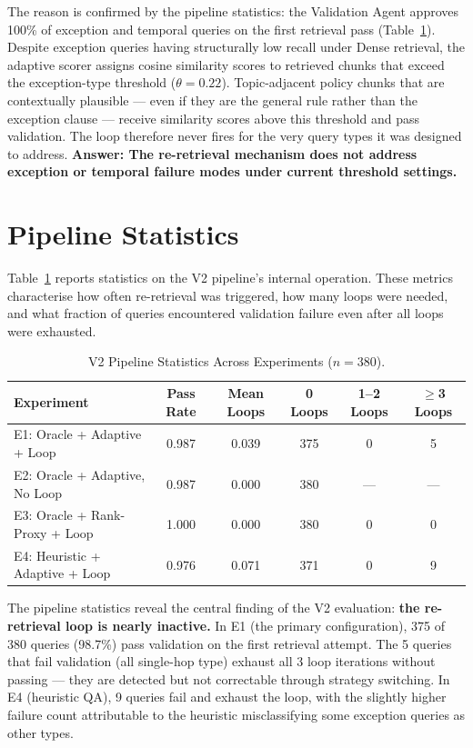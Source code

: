 The reason is confirmed by the pipeline statistics: the Validation Agent approves 100\% of exception and temporal queries on the first retrieval pass (Table~\ref{tab:v2_pipeline_stats}). Despite exception queries having structurally low recall under Dense retrieval, the adaptive scorer assigns cosine similarity scores to retrieved chunks that exceed the exception-type threshold ($\theta=0.22$). Topic-adjacent policy chunks that are contextually plausible --- even if they are the general rule rather than the exception clause --- receive similarity scores above this threshold and pass validation. The loop therefore never fires for the very query types it was designed to address. \textbf{Answer: The re-retrieval mechanism does not address exception or temporal failure modes under current threshold settings.}


\section{Pipeline Statistics}
\label{sec:v2_pipeline_stats}

Table~\ref{tab:v2_pipeline_stats} reports statistics on the V2 pipeline's internal operation. These metrics characterise how often re-retrieval was triggered, how many loops were needed, and what fraction of queries encountered validation failure even after all loops were exhausted.

\begin{table}[htbp]
\centering
\caption{V2 Pipeline Statistics Across Experiments ($n{=}380$).}
\label{tab:v2_pipeline_stats}
\begin{tabular}{lccccc}
\toprule
\textbf{Experiment} & \textbf{Pass Rate} & \textbf{Mean Loops} & \textbf{0 Loops} & \textbf{1--2 Loops} & \textbf{$\geq$3 Loops} \\
\midrule
E1: Oracle + Adaptive + Loop    & 0.987 & 0.039 & 375 & 0 & 5 \\
E2: Oracle + Adaptive, No Loop  & 0.987 & 0.000 & 380 & --- & --- \\
E3: Oracle + Rank-Proxy + Loop  & 1.000 & 0.000 & 380 & 0 & 0 \\
E4: Heuristic + Adaptive + Loop & 0.976 & 0.071 & 371 & 0 & 9 \\
\bottomrule
\end{tabular}
\end{table}

The pipeline statistics reveal the central finding of the V2 evaluation: \textbf{the re-retrieval loop is nearly inactive.} In E1 (the primary configuration), 375 of 380 queries (98.7\%) pass validation on the first retrieval attempt. The 5 queries that fail validation (all single-hop type) exhaust all 3 loop iterations without passing --- they are detected but not correctable through strategy switching. In E4 (heuristic QA), 9 queries fail and exhaust the loop, with the slightly higher failure count attributable to the heuristic misclassifying some exception queries as other types.

